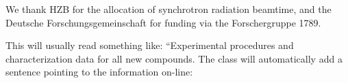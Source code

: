 \documentclass[journal=jpccck,manuscript=article]{achemso}
\begin{document}
\begin{acknowledgement}
%
We thank HZB for the allocation of synchrotron radiation beamtime, and the Deutsche Forschungsgemeinschaft for funding via the Forschergruppe 1789.
%
\end{acknowledgement}

\begin{suppinfo}

This will usually read something like: ``Experimental procedures and
characterization data for all new compounds. The class will
automatically add a sentence pointing to the information on-line:

\end{suppinfo}


\end{document}

